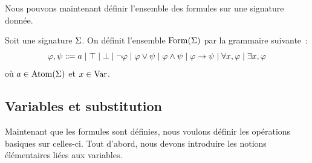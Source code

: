 Nous pouvons maintenant définir l'ensemble des formules sur une signature
donnée.

\begin{definition}[Formules]
  Soit une signature $\Sigma$. On définit l'ensemble $\operatorname{Form}(\Sigma)$ par
  la grammaire suivante~:
  \[\varFF,\varFP \inddefeq a\mid \top\mid\bot\mid\lnot\varFF
  \mid\varFF\lor\varFP\mid \varFF\land\varFP\mid \varFF\to\varFP\mid
  \forall x,\varFF\mid \exists x,\varFF\]
  où $a\in \operatorname{Atom}(\Sigma)$ et $x\in \operatorname{Var}$.
\end{definition}

\subsection{Variables et substitution}

Maintenant que les formules sont définies, nous voulons définir les opérations
basiques sur celles-ci. Tout d'abord, nous devons introduire les notions
élémentaires liées aux variables.

